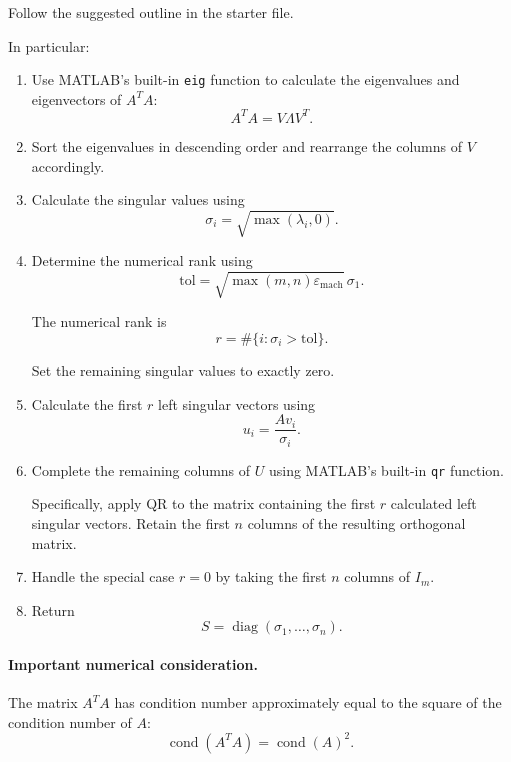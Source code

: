 \documentclass{ximera}
\begin{document}
Follow the suggested outline in the starter file.

In particular:

\begin{enumerate}
    \item Use MATLAB's built-in \texttt{eig} function to calculate
    the eigenvalues and eigenvectors of $A^TA$:
    \[
    A^TA=V\Lambda V^T.
    \]

    \item Sort the eigenvalues in descending order and rearrange
    the columns of $V$ accordingly.

    \item Calculate the singular values using
    \[
    \sigma_i=\sqrt{\max(\lambda_i,0)}.
    \]

    \item Determine the numerical rank using
    \[
    \text{tol}=
    \sqrt{\max(m,n)\varepsilon_{\mathrm{mach}}}\,\sigma_1.
    \]

    The numerical rank is
    \[
    r=\#\{i:\sigma_i>\text{tol}\}.
    \]

    Set the remaining singular values to exactly zero.

    \item Calculate the first $r$ left singular vectors using
    \[
    u_i=\frac{Av_i}{\sigma_i}.
    \]

    \item Complete the remaining columns of $U$ using MATLAB's
    built-in \texttt{qr} function.

    Specifically, apply QR to the matrix containing the first
    $r$ calculated left singular vectors. Retain the first $n$
    columns of the resulting orthogonal matrix.

    \item Handle the special case $r=0$ by taking the first
    $n$ columns of $I_m$.

    \item Return
    \[
    S=\operatorname{diag}(\sigma_1,\ldots,\sigma_n).
    \]
\end{enumerate}

\paragraph{Important numerical consideration.}

The matrix $A^TA$ has condition number approximately equal to
the square of the condition number of $A$:
\[
\operatorname{cond}(A^TA)=\operatorname{cond}(A)^2.
\]
\end{document}
